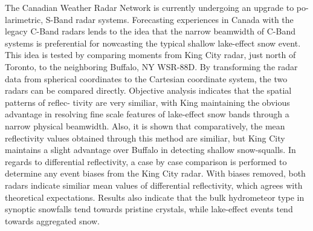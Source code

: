 The Canadian Weather Radar Network is currently undergoing an upgrade to po-
larimetric, S-Band radar systems. Forecasting experiences in Canada with the
legacy C-Band radars lends to the idea that the narrow beamwidth of C-Band systems
is preferential for nowcasting the typical shallow lake-effect snow event. This
idea is tested by comparing moments from King City radar, just north of Toronto,
to the neighboring Buffalo, NY WSR-88D. By transforming the radar data from
spherical coordinates to the Cartesian coordinate system, the two radars can be
compared directly. Objective analysis indicates that the spatial patterns of reflec-
tivity are very similiar, with King maintaining the obvious advantage in resolving
fine scale features of lake-effect snow bands through a narrow physical beamwidth.
Also, it is shown that comparatively, the mean reflectivity values obtained through
this method are similiar, but King City maintains a slight advantage over Buffalo in
detecting shallow snow-squalls. In regards to differential reflectivity, a case by case
comparison is performed to determine any event biases from the King City radar. With
biases removed, both radars indicate similiar mean values of differential reflectivity, which agrees with
theoretical expectations. Results also indicate that the bulk hydrometeor type in synoptic snowfalls tend towards
pristine crystals, while lake-effect events tend towards aggregated snow.
